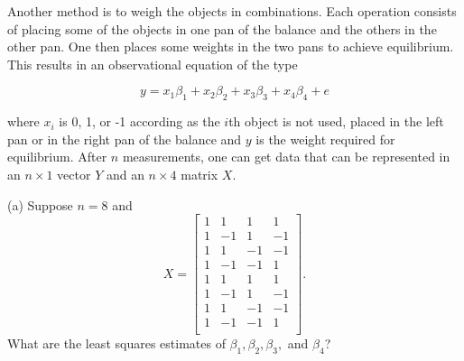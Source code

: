 \documentclass[12pt]{article}
\begin{document}
\begin{enumerate}[leftmargin=0cm,itemindent=.5cm,labelwidth=\itemindent,labelsep=0cm,align=left]
Another method is to weigh the objects in combinations. Each operation consists of placing some of the objects in one pan of the balance and the others in the other pan. One then places some weights in the two pans to achieve equilibrium. This results in an observational equation
of the type

$$y = x_1 \beta_1 + x_2 \beta_2 + x_3 \beta_3 + x_4 \beta_4 + e$$

where $x_i$ is 0, 1, or -1 according as the $i$th object is not used, placed in the left pan or in the right pan of the balance and $y$ is the weight required for equilibrium.  After $n$ measurements, one can get data that can be represented in an $n \times 1$ vector $Y$ and an $n \times 4$ matrix $X$.


(a) Suppose $n = 8$ and $$X = \left[ \begin{matrix}
1 & 1 & 1 & 1 \\
1 & -1 & 1 & -1 \\
1 & 1 & -1 & -1 \\
1 & -1 & -1 & 1 \\
1 & 1 & 1 & 1 \\
1 & -1 & 1 & -1 \\
1 & 1 & -1 & -1 \\
1 & -1 & -1 & 1 \\
\end{matrix} \right].$$
What are the least squares estimates of $\beta_1, \beta_2, \beta_3,$ and $\beta_4$?


\end{enumerate}
\end{document}
